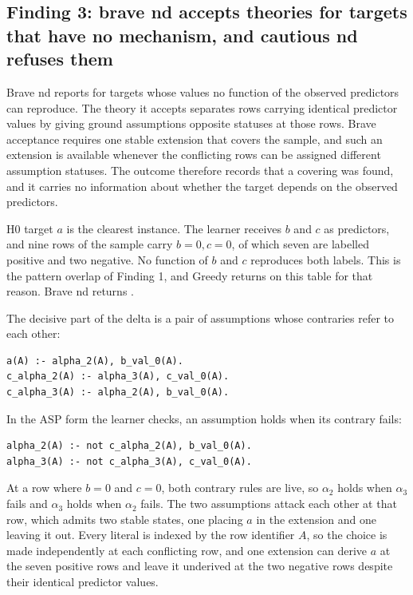 \documentclass[11pt]{article}
\DeclareRobustCommand{\code}[1]{\texttt{\detokenize{#1}}}
\begin{document}
\subsection{Finding 3: brave nd accepts theories for targets that have no
mechanism, and cautious nd refuses them}

Brave nd reports \code{solved} for targets whose values no function of the
observed predictors can reproduce. The theory it accepts separates rows carrying
identical predictor values by giving ground assumptions opposite statuses at those
rows. Brave acceptance requires one stable extension that covers the sample, and
such an extension is available whenever the conflicting rows can be assigned
different assumption statuses. The \code{solved} outcome therefore records that a
covering was found, and it carries no information about whether the target depends
on the observed predictors.

H0 target \(a\) is the clearest instance. The learner receives \(b\) and \(c\) as
predictors, and nine rows of the sample carry \(b{=}0, c{=}0\), of which seven are
labelled positive and two negative. No function of \(b\) and \(c\) reproduces both
labels. This is the pattern overlap of Finding 1, and Greedy returns
\code{completed_no_solution} on this table for that reason. Brave nd returns
\code{solved}.

The decisive part of the delta is a pair of assumptions whose contraries refer to
each other:

\begin{lstlisting}
a(A) :- alpha_2(A), b_val_0(A).
c_alpha_2(A) :- alpha_3(A), c_val_0(A).
c_alpha_3(A) :- alpha_2(A), b_val_0(A).
\end{lstlisting}

In the ASP form the learner checks, an assumption holds when its contrary fails:

\begin{lstlisting}
alpha_2(A) :- not c_alpha_2(A), b_val_0(A).
alpha_3(A) :- not c_alpha_3(A), c_val_0(A).
\end{lstlisting}

At a row where \(b{=}0\) and \(c{=}0\), both contrary rules are live, so
\(\alpha_2\) holds when \(\alpha_3\) fails and \(\alpha_3\) holds when \(\alpha_2\)
fails. The two assumptions attack each other at that row, which admits two stable
states, one placing \(a\) in the extension and one leaving it out. Every literal is
indexed by the row identifier \(A\), so the choice is made independently at each
conflicting row, and one extension can derive \(a\) at the seven positive rows and
leave it underived at the two negative rows despite their identical predictor
values.
\end{document}
